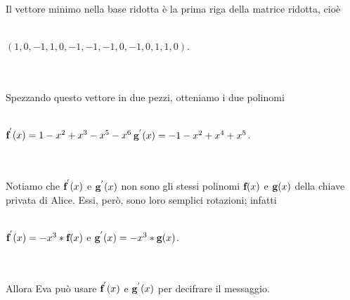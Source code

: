 \documentclass[a4paper,12pt]{report}
\theoremstyle{plain}
\theoremstyle{definition}
\theoremstyle{remark}
\begin{document}
\\ \\
Il vettore minimo nella base ridotta \` e la prima riga della matrice ridotta, cio\` e \\ \\ \centerline{$(1,0,-1,1,0,-1,-1,-1,0,-1,0,1,1,0)$.}\\ \\Spezzando questo vettore in due pezzi, otteniamo i due polinomi \\ \\ \centerline{$\textbf f^{'}(x)=1-x^2+x^3-x^5-x^6$\hspace{1cm}$\textbf g^{'}(x)=-1-x^2+x^4+x^5$.}\\ \\ Notiamo che $\textbf f^{'}(x)$ e $\textbf g^{'}(x)$ non sono gli stessi polinomi $\textbf f(x)$ e $\textbf g(x)$ della chiave privata di Alice. Essi, per\` o, sono loro semplici rotazioni; infatti \\ \\ \centerline{$\textbf f^{'}(x)=-x^3*\textbf f(x)$\hspace{1cm} e \hspace{1cm} $\textbf g^{'}(x)=-x^3*\textbf g(x)$.}\\ \\Allora Eva pu\` o usare $\textbf f^{'}(x)$ e  $\textbf g^{'}(x)$ per decifrare il messaggio.





\clearpage{\pagestyle{empty}\cleardoublepage}
\tableofcontents                        %

\rhead[\fancyplain{}{\bfseries\leftmark}]{\fancyplain{}{\bfseries\thepage}}

\lhead[\fancyplain{}{\bfseries\thepage}]{\fancyplain{}{\bfseries\rightmark}}
\end{document}
